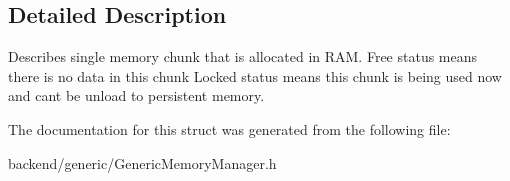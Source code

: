 \subsection{Detailed Description}
Describes single memory chunk that is allocated in R\+AM. Free status means there is no data in this chunk Locked status means this chunk is being used now and can\textquotesingle{}t be unload to persistent memory. 

The documentation for this struct was generated from the following file\+:\begin{DoxyCompactItemize}
\item 
backend/generic/Generic\+Memory\+Manager.\+h\end{DoxyCompactItemize}
